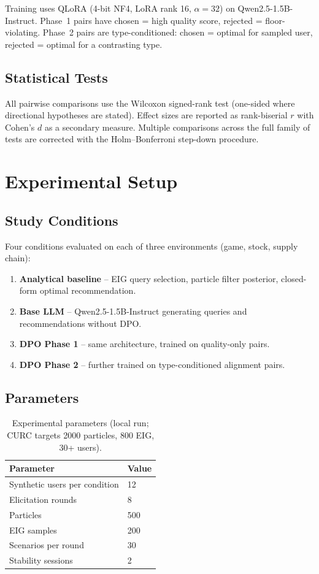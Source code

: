 \documentclass[11pt]{article}
\begin{document}
Training uses QLoRA (4-bit NF4, LoRA rank 16, $\alpha=32$) on
Qwen2.5-1.5B-Instruct. Phase~1 pairs have chosen = high quality score,
rejected = floor-violating. Phase~2 pairs are type-conditioned: chosen =
optimal for sampled user, rejected = optimal for a contrasting type.

\subsection{Statistical Tests}

All pairwise comparisons use the Wilcoxon signed-rank test (one-sided where
directional hypotheses are stated).  Effect sizes are reported as rank-biserial
$r$ with Cohen's $d$ as a secondary measure.  Multiple comparisons across the
full family of tests are corrected with the Holm--Bonferroni step-down
procedure.

\section{Experimental Setup}

\subsection{Study Conditions}

Four conditions evaluated on each of three environments (game, stock, supply
chain):
\begin{enumerate}
  \item \textbf{Analytical baseline} -- EIG query selection, particle filter
    posterior, closed-form optimal recommendation.
  \item \textbf{Base LLM} -- Qwen2.5-1.5B-Instruct generating queries and
    recommendations without DPO.
  \item \textbf{DPO Phase 1} -- same architecture, trained on quality-only pairs.
  \item \textbf{DPO Phase 2} -- further trained on type-conditioned alignment
    pairs.
\end{enumerate}

\subsection{Parameters}

\begin{table}[h]
\centering
\begin{tabular}{ll}
\toprule
Parameter & Value \\
\midrule
Synthetic users per condition & 12 \\
Elicitation rounds & 8 \\
Particles & 500 \\
EIG samples & 200 \\
Scenarios per round & 30 \\
Stability sessions & 2 \\
\bottomrule
\end{tabular}
\caption{Experimental parameters (local run; CURC targets 2000 particles, 800 EIG, 30+ users).}
\label{tab:params}
\end{table}
\end{document}
